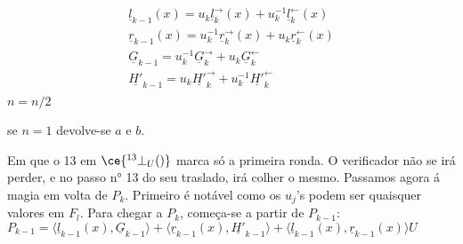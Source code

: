 \begin{align*}
\underline{l}_{k-1}(x) = u_{k} \underline{l}_{k}^{\rightarrow}(x) + u^{-1}_{k} \underline{l}_{k}^{\leftarrow}(x)\\
\underline{r}_{k-1}(x) = u^{-1}_{k} \underline{r}_{k}^{\rightarrow}(x) + u_{k} \underline{r}_{k}^{\leftarrow}(x)\\
\underline{G}_{k-1} = u^{-1}_{k} \underline{G}_{k}^{\rightarrow} + u_{k} \underline{G}_{k}^{\leftarrow}\\
\underline{H'}_{k-1} = u_{k} \underline{H'}_{k}^{\rightarrow} + u^{-1}_{k} \underline{H'}_{k}^{\leftarrow}\\
\end{align*}
$n=n/2$

se $n=1$ devolve-se $a$ e $b$.

Em que o 13 em $\ce{^{13}_{\ }\bot_U()}$ marca só a primeira ronda. O verificador não se irá perder, e no passo n° 13 do seu traslado, irá colher o mesmo. Passamos agora á magia em volta de $P_k$. Primeiro é notável como os $u_{j}$'s podem ser quaisquer valores em $F_l$. Para chegar a $P_k$, começa-se a partir de  $P_{k-1}$:\newline  
$
P_{k-1} = \langle \underline{l}_{k-1}(x),\underline{G}_{k-1}\rangle + \langle \underline{r}_{k-1}(x),\underline{H'}_{k-1}\rangle + \langle \underline{l}_{k-1}(x), \underline{r}_{k-1}(x)\rangle U
$

